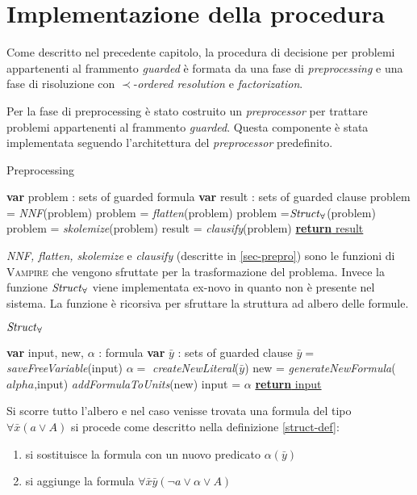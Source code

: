 \chapter{Implementazione della procedura}
Come descritto nel precedente capitolo, la procedura di decisione per problemi
appartenenti al frammento \emph{guarded} è formata da una fase di \emph{preprocessing} e 
una fase di risoluzione con $\prec$-\emph{ordered resolution} e \emph{factorization}.

Per la fase di preprocessing è stato costruito un \emph{preprocessor} per trattare problemi 
appartenenti al frammento \emph{guarded}. Questa componente è stata implementata seguendo l'architettura 
del \emph{preprocessor} predefinito.
\begin{algorithm}
    \caption{Preprocessing}
    \begin{algorithmic}
        \State \textbf{var} problem : sets of guarded formula
        \State \textbf{var} result : sets of guarded clause 
        \State problem = \emph{NNF}(problem)
        \State problem = \emph{flatten}(problem)
        \State problem =$\text{\emph{Struct}}_\forall$(problem)
        \State problem = \emph{skolemize}(problem)
        \State result = \emph{clausify}(problem)
        \State \underline{\textbf{return} result}
    \end{algorithmic}
\end{algorithm}

\emph{NNF, flatten, skolemize} e \emph{clausify} (descritte in \ref{sec-prepro}) sono le funzioni di 
\textsc{Vampire} che vengono sfruttate per la trasformazione del problema.
Invece la funzione $\text{\emph{Struct}}_\forall$ viene implementata ex-novo in quanto non è presente 
nel sistema. La funzione è ricorsiva per sfruttare la struttura ad albero delle formule.

\begin{algorithm}
    \caption{$\text{\emph{Struct}}_\forall$}
    \begin{algorithmic}
        \State \textbf{var} input, new, $\alpha$ : formula
        \State \textbf{var} $\bar{y}$ : sets of guarded clause 
        \State $\bar{y} =$ \emph{saveFreeVariable}(input)
        \State $\alpha =$ \emph{createNewLiteral}($\bar{y}$)
        \State new = \emph{generateNewFormula}($alpha$,input)
        \State \emph{addFormulaToUnits}(new)
        \State input = $\alpha$
        \State \underline{\textbf{return} input}
    \end{algorithmic}
\end{algorithm}
Si scorre tutto l'albero e nel caso venisse trovata una formula del tipo $\forall\bar{x}(a \lor A)$ si procede come 
descritto nella definizione \ref{struct-def}:
\begin{enumerate}
    \item si sostituisce la formula con un nuovo predicato $\alpha(\bar{y})$
    \item si aggiunge la formula $\forall \bar{x}\bar{y}(\lnot a \lor \alpha \lor A)$
\end{enumerate}


